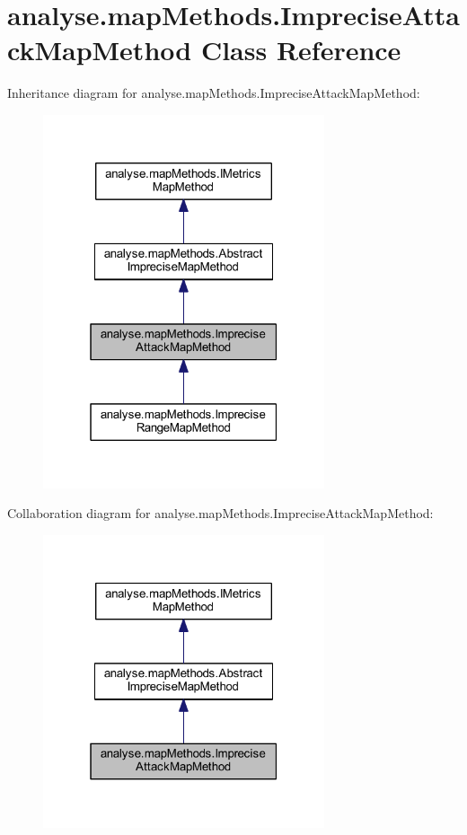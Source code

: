 \hypertarget{classanalyse_1_1map_methods_1_1_imprecise_attack_map_method}{}\section{analyse.\+map\+Methods.\+Imprecise\+Attack\+Map\+Method Class Reference}
\label{classanalyse_1_1map_methods_1_1_imprecise_attack_map_method}


Inheritance diagram for analyse.\+map\+Methods.\+Imprecise\+Attack\+Map\+Method\+:
\nopagebreak
\begin{figure}[H]
\begin{center}
\leavevmode
\includegraphics[width=235pt]{classanalyse_1_1map_methods_1_1_imprecise_attack_map_method__inherit__graph}
\end{center}
\end{figure}


Collaboration diagram for analyse.\+map\+Methods.\+Imprecise\+Attack\+Map\+Method\+:
\nopagebreak
\begin{figure}[H]
\begin{center}
\leavevmode
\includegraphics[width=235pt]{classanalyse_1_1map_methods_1_1_imprecise_attack_map_method__coll__graph}
\end{center}
\end{figure}
